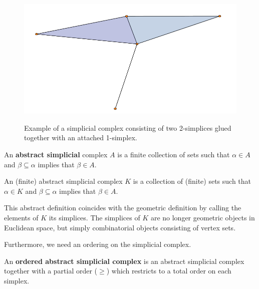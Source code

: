 \begin{figure}
  \centering
  \includegraphics[scale=0.7]{complex.pdf}
  \label{complex}
  \caption{Example of a simplicial complex consisting of two 2-simplices glued together with an attached 1-simplex.}
\end{figure}

\begin{definition}[book]
An \textbf{abstract simplicial} complex $A$ is a finite collection of sets such that $\alpha \in A$ and $\beta \subseteq \alpha$ implies that $\beta \in A$.
\end{definition}

\begin{definition}[book]
An (finite) abstract simplicial complex $K$ is a collection of (finite) sets such that $\alpha \in K$ and $\beta \subseteq \alpha$ implies that $\beta \in A$.
\end{definition}

This abstract definition coincides with the geometric definition by calling the elements of $K$ its simplices. The simplices of $K$ are no longer geometric objects in Euclidean space, but simply combinatorial objects consisting of vertex sets.



Furthermore, we need an ordering on the simplicial complex.

\begin{definition}
An \textbf{ordered abstract simplicial complex} is an abstract simplicial complex together with a partial order ($\geq$) which restricts to a total order on each simplex.
\end{definition}


